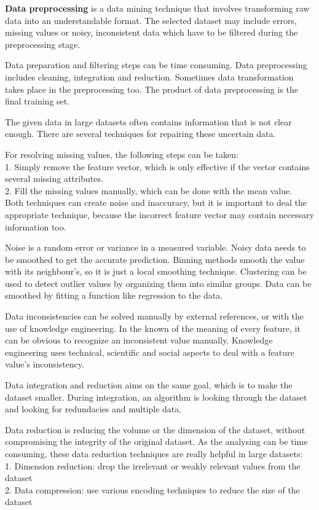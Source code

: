 \textbf{Data preprocessing} \cite{pyle1999data} is a data mining technique that involves transforming raw data into an understandable format. The selected dataset may include errors, missing values or noisy, inconsistent data which have to be filtered during the preprocessing stage. \medskip

Data preparation and filtering steps can be time consuming. Data preprocessing includes cleaning, integration and reduction. Sometimes data transformation takes place in the preprocessing too. The product of data preprocessing is the final training set.\bigskip

The given data in large datasets often contains information that is not clear enough. There are several techniques for repairing these uncertain data. \bigskip

\noindent For resolving missing values, the following steps can be taken:\\
1. Simply remove the feature vector, which is only effective if the vector contains several missing attributes.\\
2. Fill the missing values manually, which can be done with the mean value.\\
Both techniques can create noise and inaccuracy, but it is important to deal the appropriate technique, because the incorrect feature vector may contain necessary information too. \bigskip


Noise is a random error or variance in a measured variable. Noisy data needs to be smoothed to get the accurate prediction. Binning methods smooth the value with its neighbour's, so it is just a local smoothing technique. Clustering can be used to detect outlier values by organizing them into similar groups. Data can be smoothed by fitting a function like regression to the data.\medskip

Data inconsistencies can be solved manually by external references, or with the use of knowledge engineering. In the known of the meaning of every feature, it can be obvious to recognize an inconsistent value manually. Knowledge engineering uses technical, scientific and social aspects to deal with a feature value's inconsistency.\medskip


Data integration and reduction aims on the same goal, which is to make the dataset smaller. During integration, an algorithm is looking through the dataset and looking for redundacies and multiple data. \medskip

Data reduction is reducing the volume or the dimension of the dataset, without compromising the integrity of the original dataset. As the analysing can be time consuming, these data reduction techniques are really helpful in large datasets:\\
1. Dimension reduction: drop the irrelevant or weakly relevant values from the dataset\\
2. Data compression: use various encoding techniques to reduce the size of the dataset


